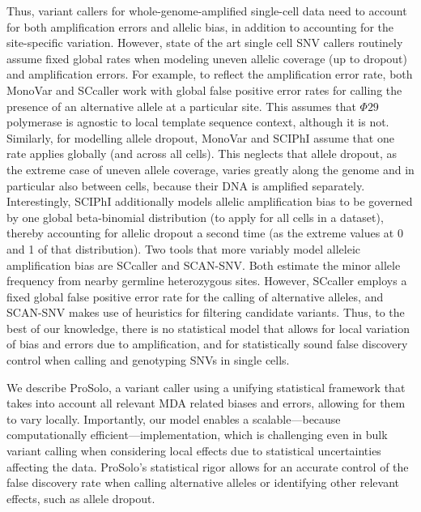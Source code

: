 \documentclass[12pt,inline]{wlscirep}
\begin{document}
Thus, variant callers for whole-genome-amplified single-cell data need to account for both amplification errors and allelic bias, in addition to accounting for the site-specific variation.
However, state of the art single cell SNV callers routinely assume fixed global rates when modeling uneven allelic coverage (up to dropout) and amplification errors. 
For example, to reflect the amplification error rate, both MonoVar\cite{zafar_monovar:_2016} and SCcaller\cite{dong_accurate_2017} work with global false positive error rates for calling the presence of an alternative allele at a particular site.
This assumes that $\Phi29$ polymerase is agnostic to local template sequence context, although it is not\cite{de_paz_high-resolution_2018}.
Similarly, for modelling allele dropout, MonoVar\cite{zafar_monovar:_2016} and SCIPhI\cite{singer_single-cell_2018} assume that one rate applies globally (and across all cells).
This neglects that allele dropout, as the extreme case of uneven allele coverage, varies greatly along the genome and in particular also between cells, because their DNA is amplified separately.
Interestingly, SCIPhI\cite{singer_single-cell_2018} additionally models allelic amplification bias to be governed by one global beta-binomial distribution (to apply for all cells in a dataset), thereby accounting for allelic dropout a second time (as the extreme values at 0 and 1 of that distribution).
Two tools that more variably model alleleic amplification bias are SCcaller \cite{dong_accurate_2017} and SCAN-SNV\cite{luquette_identification_2019}.
Both estimate the minor allele frequency from nearby germline heterozygous sites. 
However, SCcaller employs a fixed global false positive error rate for the calling of alternative alleles\cite{dong_accurate_2017}, and SCAN-SNV makes use of heuristics for filtering candidate variants\cite{luquette_identification_2019}.
Thus, to the best of our knowledge, there is no statistical model that allows for local variation of bias and errors due to amplification, and for statistically sound false discovery control when calling and genotyping SNVs in single cells.

We describe ProSolo, a variant caller using a unifying statistical framework that takes into account all relevant MDA related biases and errors, allowing for them to vary locally.
Importantly, our model enables a scalable---because computationally efficient---implementation, which is challenging even in bulk variant calling when considering local effects due to statistical uncertainties affecting the data\cite{koster_varlociraptor_2020}.
ProSolo's statistical rigor allows for an accurate control of the false discovery rate when calling alternative alleles or identifying other relevant effects, such as allele dropout.
\end{document}
